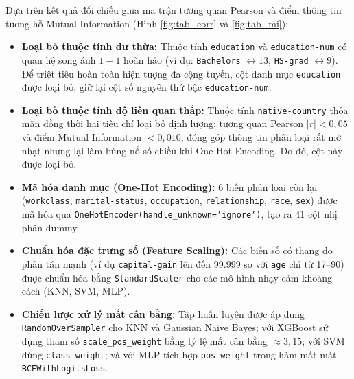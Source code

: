 \documentclass[a4paper,11pt]{article}
\begin{document}
Dựa trên kết quả đối chiếu giữa ma trận tương quan Pearson và điểm thông tin tương hỗ Mutual Information (Hình \ref{fig:tab_corr} và \ref{fig:tab_mi}):
\begin{itemize}
    \item \textbf{Loại bỏ thuộc tính dư thừa:} Thuộc tính \texttt{education} và \texttt{education-num} có quan hệ song ánh $1-1$ hoàn hảo (ví dụ: \texttt{Bachelors} $\leftrightarrow 13$, \texttt{HS-grad} $\leftrightarrow 9$). Để triệt tiêu hoàn toàn hiện tượng đa cộng tuyến, cột danh mục \texttt{education} được loại bỏ, giữ lại cột số nguyên thứ bậc \texttt{education-num}.
    \item \textbf{Loại bỏ thuộc tính độ liên quan thấp:} Thuộc tính \texttt{native-country} thỏa mãn đồng thời hai tiêu chí loại bỏ định lượng: tương quan Pearson $|r| < 0{,}05$ và điểm Mutual Information $< 0{,}010$, đóng góp thông tin phân loại rất mờ nhạt nhưng lại làm bùng nổ số chiều khi One-Hot Encoding. Do đó, cột này được loại bỏ.
    \item \textbf{Mã hóa danh mục (One-Hot Encoding):} 6 biến phân loại còn lại (\texttt{workclass}, \texttt{marital-status}, \texttt{occupation}, \texttt{relationship}, \texttt{race}, \texttt{sex}) được mã hóa qua \texttt{OneHotEncoder(handle\_unknown='ignore')}, tạo ra 41 cột nhị phân dummy.
    \item \textbf{Chuẩn hóa đặc trưng số (Feature Scaling):} Các biến số có thang đo phân tán mạnh (ví dụ \texttt{capital-gain} lên đến 99.999 so với \texttt{age} chỉ từ 17--90) được chuẩn hóa bằng \texttt{StandardScaler} cho các mô hình nhạy cảm khoảng cách (KNN, SVM, MLP).
    \item \textbf{Chiến lược xử lý mất cân bằng:} Tập huấn luyện được áp dụng \texttt{RandomOverSampler} cho KNN và Gaussian Naive Bayes; với XGBoost sử dụng tham số \texttt{scale\_pos\_weight} bằng tỷ lệ mất cân bằng $\approx 3{,}15$; với SVM dùng \texttt{class\_weight}; và với MLP tích hợp \texttt{pos\_weight} trong hàm mất mát \texttt{BCEWithLogitsLoss}.
\end{itemize}
\end{document}
